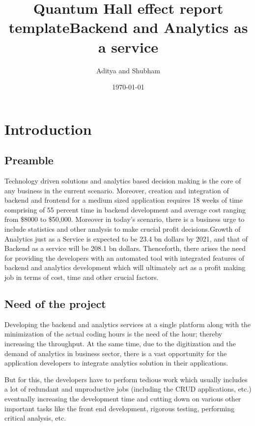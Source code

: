 \documentclass[a4paper]{report}
\title{Quantum Hall effect report template}
\title{Backend and Analytics as a service}
\author{Aditya and Shubham}
\date{\today}
\begin{document}
    
    \begin{titlepage}
      \maketitle 
    \end{titlepage}    
    
    \newpage
    \tableofcontents{}    

    \chapter {Introduction}
    
    \section{Preamble}
    \label{sec:introduction}    
    Technology driven solutions and analytics based decision making is the core of any business in the current scenario. Moreover, creation and integration of backend and frontend for a medium sized application requires 18 weeks of time comprising of 55 percent time in backend development and average cost ranging from \$8000 to \$50,000.  Moreover in today’s scenario, there is a business urge to include statistics and other analysis to make crucial profit decisions.Growth of Analytics just as a Service is expected to be  23.4 bn dollars by 2021, and that of Backend as a service will be 208.1 bn dollars. Thenceforth, there arises the need for providing the developers with an automated tool with integrated features of backend and analytics development which will ultimately act as a profit making job in terms of cost, time and other crucial factors.
    
    \section{Need of the project}
    \label{sec:theory}
    Developing the backend and analytics services at a single platform along with the minimization of the actual coding hours is the need of the hour; thereby increasing the throughput. At the same time, due to the digitization and the demand of analytics in business sector, there is a vast opportunity for the application developers to integrate analytics solution in their applications. 
    
    But for this, the developers have to perform tedious work which usually includes a lot of redundant and unproductive jobs (including the CRUD applications, etc.)  eventually increasing the development time and cutting down on various other important tasks like the front end development, rigorous testing, performing critical analysis, etc. 
    
\end{document}

